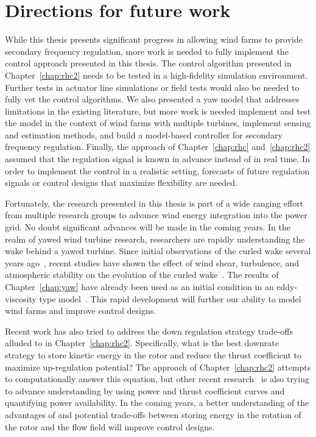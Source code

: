 \section{Directions for future work}
While this thesis presents significant progress in allowing wind farms to provide secondary frequency regulation, more work is needed to fully implement the control approach presented in this thesis. The control algorithm presented in Chapter~\ref{chap:rhc2} needs to be tested in a high-fidelity simulation environment. Further tests in actuator line simulations or field tests would also be needed to fully vet the control algorithms. We also presented a yaw model that addresses limitations in the existing literature, but more work is needed implement and test the model in the context of wind farms with multiple turbines, implement sensing and estimation methods, and build a model-based controller for secondary frequency regulation. Finally, the approach of Chapter~\ref{chap:rhc} and~\ref{chap:rhc2} assumed that the regulation signal is known in advance instead of in real time. In order to implement the control in a realistic setting, forecasts of future regulation signals or control designs that maximize flexibility are needed.

Fortunately, the research presented in this thesis is part of a wide ranging effort from multiple research groups to advance wind energy integration into the power grid. No doubt significant advances will be made in the coming years. In the realm of yawed wind turbine research, researchers are rapidly understanding the wake behind a yawed turbine. Since initial observations of the curled wake several years ago~\cite{Howland2016a}, recent studies have shown the effect of wind shear, turbulence, and atmospheric stability on the evolution of the curled wake~\cite{Bartl2018a, Vollmer2016a}. The results of Chapter~\ref{chap:yaw} have already been used as an initial condition in an eddy-viscosity type model~\cite{Martinez2018a}. This rapid development will further our ability to model wind farms and improve control designs.

Recent work has also tried to address the down regulation strategy trade-offs alluded to in Chapter~\ref{chap:rhc2}. Specifically, what is the best downrate strategy to store kinetic energy in the rotor and reduce the thrust coefficient to maximize up-regulation potential? The approach of Chapter~\ref{chap:rhc2} attempts to computationally answer this equation, but other recent research~\cite{Hoek2018a, Kazda2018a, Siniscalchi-Minna2018a} is also trying to advance understanding by using power and thrust coefficient curves and quantifying power availability. In the coming years, a better understanding of the advantages of and potential trade-offs between storing energy in the rotation of the rotor and the flow field will improve control designs.

